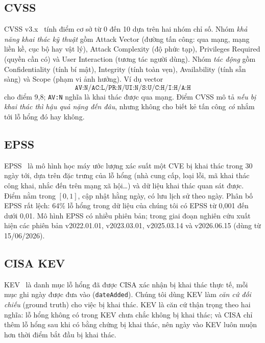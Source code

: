 \documentclass[runningheads]{llncs}
\begin{document}
\subsection{CVSS}
CVSS v3.x~\cite{cvss31} tính điểm cơ sở từ 0 đến 10 dựa trên hai nhóm chỉ số. Nhóm \emph{khả năng khai
thác kỹ thuật} gồm Attack Vector (đường tấn công: qua mạng, mạng liền kề, cục bộ hay vật lý),
Attack Complexity (độ phức tạp), Privileges Required (quyền cần có) và User Interaction (tương
tác người dùng). Nhóm \emph{tác động} gồm Confidentiality (tính bí mật), Integrity (tính toàn vẹn), Availability (tính sẵn sàng) và Scope (phạm vi ảnh hưởng).
Ví dụ vector
\[\texttt{AV:N/AC:L/PR:N/UI:N/S:U/C:H/I:H/A:H}\]
cho điểm 9,8; \texttt{AV:N} nghĩa là khai thác được qua mạng. Điểm CVSS mô tả \emph{nếu bị
khai thác thì hậu quả nặng đến đâu}, nhưng không cho biết kẻ tấn công \emph{có} nhắm tới lỗ
hổng đó hay không.

\subsection{EPSS}
EPSS~\cite{epss} là mô hình học máy ước lượng xác suất một CVE bị khai thác trong 30 ngày tới,
dựa trên đặc trưng của lỗ hổng (nhà cung cấp, loại lỗi, mã khai thác công khai, nhắc đến trên
mạng xã hội\ldots) và dữ liệu khai thác quan sát được. Điểm nằm trong $[0, 1]$, cập nhật hằng
ngày, có lưu lịch sử theo ngày. Phân bố EPSS rất lệch: 64\% lỗ hổng trong dữ liệu của chúng tôi
có EPSS từ 0,001 đến dưới 0,01. Mô hình EPSS có nhiều phiên bản; trong giai đoạn nghiên cứu
xuất hiện các phiên bản v2022.01.01, v2023.03.01, v2025.03.14 và v2026.06.15 (dùng từ 15/06/2026).

\subsection{CISA KEV}
KEV~\cite{kev} là danh mục lỗ hổng đã được CISA xác nhận bị khai thác thực tế, mỗi mục ghi
ngày được đưa vào (\texttt{dateAdded}). Chúng tôi dùng KEV làm \emph{căn cứ đối chiếu} (ground
truth) cho việc bị khai thác. KEV là căn cứ thận trọng theo hai nghĩa: lỗ hổng không có trong
KEV chưa chắc không bị khai thác; và CISA chỉ thêm lỗ hổng sau khi có bằng chứng bị khai thác,
nên ngày vào KEV luôn muộn hơn thời điểm bắt đầu bị khai thác.
\end{document}
